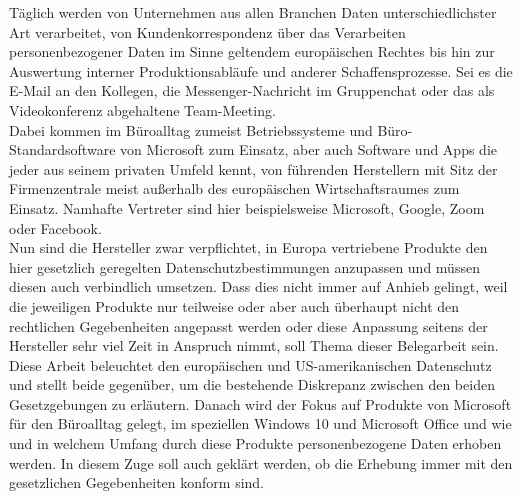 Täglich werden von Unternehmen aus allen Branchen Daten unterschiedlichster Art verarbeitet, von Kundenkorrespondenz über das Verarbeiten personenbezogener Daten im Sinne geltendem europäischen Rechtes bis hin zur Auswertung interner Produktionsabläufe und anderer Schaffensprozesse. Sei es die E-Mail an den Kollegen, die Messenger-Nachricht im Gruppenchat oder das als Videokonferenz abgehaltene Team-Meeting.\\
Dabei kommen im Büroalltag zumeist Betriebssysteme und Büro-Standardsoftware von Microsoft zum Einsatz, aber auch Software und Apps die jeder aus seinem privaten Umfeld kennt, von führenden Herstellern mit Sitz der Firmenzentrale meist außerhalb des europäischen Wirtschaftsraumes zum Einsatz. Namhafte Vertreter sind hier beispielsweise Microsoft, Google, Zoom oder Facebook.\\
Nun sind die Hersteller zwar verpflichtet, in Europa vertriebene Produkte den hier gesetzlich geregelten Datenschutzbestimmungen anzupassen und müssen diesen auch verbindlich umsetzen. Dass dies nicht immer auf Anhieb gelingt, weil die jeweiligen Produkte nur teilweise oder aber auch überhaupt nicht den rechtlichen Gegebenheiten angepasst werden oder diese Anpassung seitens der Hersteller sehr viel Zeit in Anspruch nimmt, soll Thema dieser Belegarbeit sein.\\
Diese Arbeit beleuchtet den europäischen und US-amerikanischen Datenschutz und stellt beide gegenüber, um die bestehende Diskrepanz zwischen den beiden Gesetzgebungen zu erläutern. Danach wird der Fokus auf Produkte von Microsoft für den Büroalltag gelegt, im speziellen Windows 10 und Microsoft Office und wie und in welchem Umfang durch diese Produkte personenbezogene Daten erhoben werden. In diesem Zuge soll auch geklärt werden, ob die Erhebung immer mit den gesetzlichen Gegebenheiten konform sind.